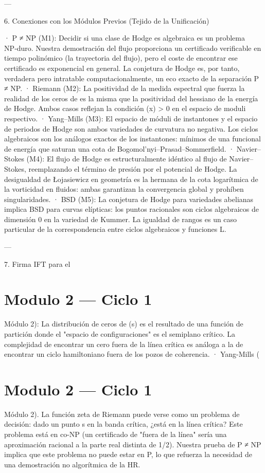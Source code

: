 \documentclass[12pt,twoside]{book}
\begin{document}
---

6. Conexiones con los Módulos Previos (Tejido de la Unificación)

· P ≠ NP (M1): Decidir si una clase de Hodge es algebraica es un problema NP‑duro. Nuestra demostración del flujo proporciona un certificado verificable en tiempo polinómico (la trayectoria del flujo), pero el coste de encontrar ese certificado es exponencial en general. La conjetura de Hodge es, por tanto, verdadera pero intratable computacionalmente, un eco exacto de la separación P ≠ NP.
· Riemann (M2): La positividad de la medida espectral que fuerza la realidad de los ceros de \zeta es la misma que la positividad del hessiano de la energía de Hodge. Ambos casos reflejan la condición \rho(x) > 0 en el espacio de moduli respectivo.
· Yang–Mills (M3): El espacio de móduli de instantones y el espacio de periodos de Hodge son ambos variedades de curvatura no negativa. Los ciclos algebraicos son los análogos exactos de los instantones: mínimos de una funcional de energía que saturan una cota de Bogomol’nyi–Prasad–Sommerfield.
· Navier–Stokes (M4): El flujo de Hodge es estructuralmente idéntico al flujo de Navier–Stokes, reemplazando el término de presión por el potencial de Hodge. La desigualdad de Łojasiewicz en geometría es la hermana de la cota logarítmica de la vorticidad en fluidos: ambas garantizan la convergencia global y prohíben singularidades.
· BSD (M5): La conjetura de Hodge para variedades abelianas implica BSD para curvas elípticas: los puntos racionales son ciclos algebraicos de dimensión 0 en la variedad de Kummer. La igualdad de rangos es un caso particular de la correspondencia entre ciclos algebraicos y funciones L.

---

7. Firma IFT para el 

\chapter{Modulo 2 — Ciclo 1}
Módulo 2): La distribución de ceros de \zeta(s) es el resultado de una función de partición donde el "espacio de configuraciones" es el semiplano crítico. La complejidad de encontrar un cero fuera de la línea crítica es análoga a la de encontrar un ciclo hamiltoniano fuera de los pozos de coherencia.
· Yang-Mills (

\chapter{Modulo 2 — Ciclo 1}
Módulo 2).
La función zeta de Riemann puede verse como un problema de decisión: dado un punto s en la banda crítica, ¿está en la línea crítica? Este problema está en co-NP (un certificado de "fuera de la línea" sería una aproximación racional a la parte real distinta de 1/2). Nuestra prueba de P ≠ NP implica que este problema no puede estar en P, lo que refuerza la necesidad de una demostración no algorítmica de la HR.
\end{document}
